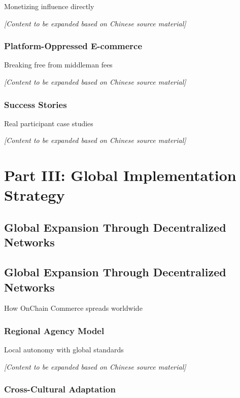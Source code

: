 \documentclass[
  Letterpaper,
]{scrbook}
\begin{document}
Monetizing influence directly

\emph{{[}Content to be expanded based on Chinese source material{]}}

\section{Platform-Oppressed
E-commerce}\label{platform-oppressed-e-commerce}

Breaking free from middleman fees

\emph{{[}Content to be expanded based on Chinese source material{]}}

\section{Success Stories}\label{success-stories}

Real participant case studies

\emph{{[}Content to be expanded based on Chinese source material{]}}

\part{Part III: Global Implementation Strategy}

\chapter{Global Expansion Through Decentralized
Networks}\label{global-expansion-through-decentralized-networks}

\chapter{Global Expansion Through Decentralized
Networks}\label{sec-global-expansion}

How OnChain Commerce spreads worldwide

\section{Regional Agency Model}\label{regional-agency-model}

Local autonomy with global standards

\emph{{[}Content to be expanded based on Chinese source material{]}}

\section{Cross-Cultural Adaptation}\label{cross-cultural-adaptation}
\end{document}
